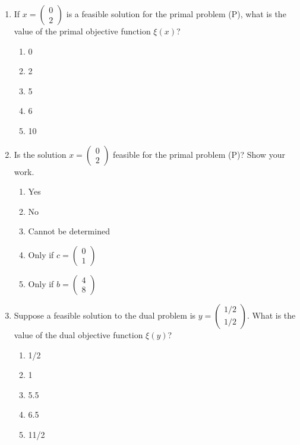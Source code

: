 \documentclass{article}%
\begin{document}
\begin{enumerate}
\begin{enumerate}
\begin{enumerate}
\end{enumerate}%
\vspace{0.5em}%
\item If $x = \begin{pmatrix} 0 \\ 2 \end{pmatrix}$ is a feasible solution for the primal problem (P), what is the value of the primal objective function $\xi(x)$?%
\begin{enumerate}%
\item 0%
\item 2%
\item 5%
\item 6%
\item 10%
\end{enumerate}%
\vspace{0.5em}%
\item Is the solution $x = \begin{pmatrix} 0 \\ 2 \end{pmatrix}$ feasible for the primal problem (P)? Show your work.%
\begin{enumerate}%
\item Yes%
\item No%
\item Cannot be determined%
\item Only if $c = \begin{pmatrix} 0 \\ 1 \end{pmatrix}$%
\item Only if $b = \begin{pmatrix} 4 \\ 8 \end{pmatrix}$%
\end{enumerate}%
\vspace{0.5em}%
\item Suppose a feasible solution to the dual problem is $y = \begin{pmatrix} 1/2 \\ 1/2 \end{pmatrix}$. What is the value of the dual objective function $\xi(y)$?%
\begin{enumerate}%
\item 1/2%
\item 1%
\item 5.5%
\item 6.5%
\item 11/2%
\end{enumerate}%

\end{enumerate}
\end{enumerate}
\end{document}
